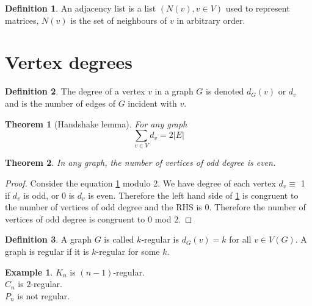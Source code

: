 \documentclass{article}
\newtheorem*{thm}{Theorem}
\theoremstyle{definition}
\newtheorem*{defn}{Definition}
\newtheorem*{ex}{Example}
\begin{document}
\begin{defn}
An adjacency list is a list $(N(v),v\in V)$ used to represent matrices, $N(v)$ is the set of neighbours of $v$ in arbitrary order.
\end{defn}

\section{Vertex degrees}

\begin{defn}
The degree of a vertex $v$ in a graph $G$ is denoted $d_G(v)$ or $d_v$ and is the number of edges of $G$ incident with $v$.
\end{defn}

\begin{thm}[Handshake lemma]
For any graph
\label{eq:hand}
\begin{equation}
\sum_{v\in V}d_v = 2|E|
\end{equation}
\end{thm}

\begin{thm}
In any graph, the number of vertices of odd degree is even.
\end{thm}

\begin{proof}
Consider the equation \ref{eq:hand} modulo 2.
We have degree of each vertex $d_v \equiv$ 1 if $d_v$ is odd, or 0 is $d_v$ is even.
Therefore the left hand side of \ref{eq:hand} is congruent to the number of vertices of odd degree and the RHS is 0.
Therefore the number of vertices of odd degree is congruent to 0 mod 2.
\end{proof}

\begin{defn}
A graph $G$ is called $k$-regular is $d_G(v) = k$ for all $v\in V(G)$.
A graph is regular if it is $k$-regular for some $k$.
\end{defn}

\begin{ex}
$K_n$ is $(n-1)$-regular. \\
$C_n$ is $2$-regular. \\
$P_n$ is not regular. \\
\end{ex}

\end{document}
